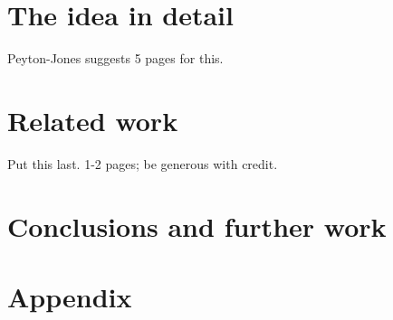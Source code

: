 \documentclass[11pt]{article}
\begin{document}
\section{The idea in detail}

Peyton-Jones suggests 5 pages for this.

\section{Related work}

Put this last. 1-2 pages; be generous with credit.



\section{Conclusions and further work}

\printbibliography

\newpage

\section*{Appendix}
\end{document}
